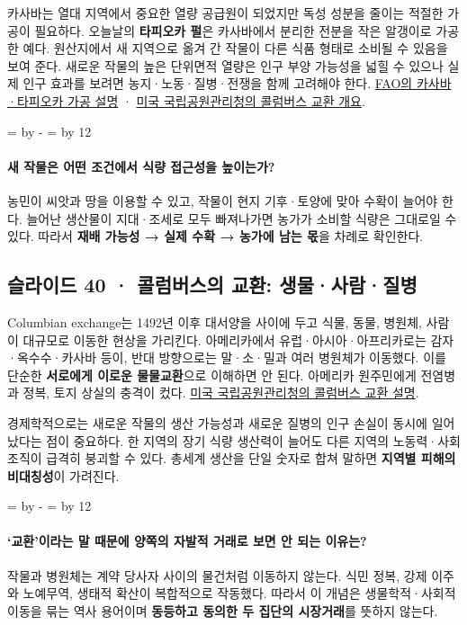 \documentclass[10pt,a4paper]{article}
\newcommand{\ReserveQuestionSpace}{%
  \par\begingroup
  \dimen0=\pagegoal \advance\dimen0 by -\pagetotal
  \dimen2=\baselineskip \multiply\dimen2 by 12
  \ifdim\dimen0<\dimen2 \newpage\fi
  \endgroup}
\begin{document}
카사바는 열대 지역에서 중요한 열량 공급원이 되었지만 독성 성분을 줄이는 적절한 가공이 필요하다. 오늘날의 \textbf{타피오카 펄}은 카사바에서 분리한 전분을 작은 알갱이로 가공한 예다. 원산지에서 새 지역으로 옮겨 간 작물이 다른 식품 형태로 소비될 수 있음을 보여 준다. 새로운 작물의 높은 단위면적 열량은 인구 부양 가능성을 넓힐 수 있으나 실제 인구 효과를 보려면 농지·노동·질병·전쟁을 함께 고려해야 한다. \href{https://www.fao.org/4/X5032E/x5032E04.htm}{FAO의 카사바·타피오카 가공 설명} · \href{https://www.nps.gov/casa/learn/historyculture/columbian-exchange.htm}{미국 국립공원관리청의 콜럼버스 교환 개요}.\par

\ReserveQuestionSpace
\paragraph{새 작물은 어떤 조건에서 식량 접근성을 높이는가?}
농민이 씨앗과 땅을 이용할 수 있고, 작물이 현지 기후·토양에 맞아 수확이 늘어야 한다. 늘어난 생산물이 지대·조세로 모두 빠져나가면 농가가 소비할 식량은 그대로일 수 있다. 따라서 \textbf{재배 가능성 → 실제 수확 → 농가에 남는 몫}을 차례로 확인한다.\par

\subsection{슬라이드 40 · 콜럼버스의 교환: 생물·사람·질병}
Columbian exchange는 1492년 이후 대서양을 사이에 두고 식물, 동물, 병원체, 사람이 대규모로 이동한 현상을 가리킨다. 아메리카에서 유럽·아시아·아프리카로는 감자·옥수수·카사바 등이, 반대 방향으로는 말·소·밀과 여러 병원체가 이동했다. 이를 단순한 \textbf{서로에게 이로운 물물교환}으로 이해하면 안 된다. 아메리카 원주민에게 전염병과 정복, 토지 상실의 충격이 컸다. \href{https://www.nps.gov/casa/learn/historyculture/columbian-exchange.htm}{미국 국립공원관리청의 콜럼버스 교환 설명}.\par

경제학적으로는 새로운 작물의 생산 가능성과 새로운 질병의 인구 손실이 동시에 일어났다는 점이 중요하다. 한 지역의 장기 식량 생산력이 늘어도 다른 지역의 노동력·사회 조직이 급격히 붕괴할 수 있다. 총세계 생산을 단일 숫자로 합쳐 말하면 \textbf{지역별 피해의 비대칭성}이 가려진다.\par

\ReserveQuestionSpace
\paragraph{‘교환’이라는 말 때문에 양쪽의 자발적 거래로 보면 안 되는 이유는?}
작물과 병원체는 계약 당사자 사이의 물건처럼 이동하지 않는다. 식민 정복, 강제 이주와 노예무역, 생태적 확산이 복합적으로 작동했다. 따라서 이 개념은 생물학적·사회적 이동을 묶는 역사 용어이며 \textbf{동등하고 동의한 두 집단의 시장거래}를 뜻하지 않는다.\par
\end{document}
